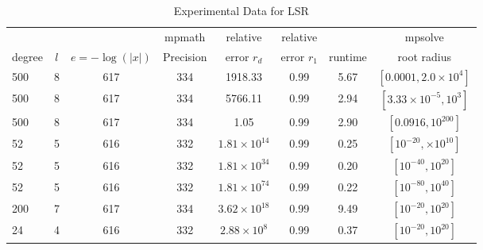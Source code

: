 \documentclass[sigconf]{acmart}
\begin{document}
\begin{table}[t]
\caption{Experimental Data for LSR} %
\label{tab:lsr}
\vskip 0.15in
\begin{center}
\begin{small}
\begin{sc}
\begin{tabular}{lccccccc}
\toprule
&  &  & mpmath & relative  & relative &  & mpsolve \\
degree  & $l$& $e=-\log(|x|)$& Precision &error $r_d$       & error $r_1$ &runtime& root radius\\
\midrule
 500 & 8 & 617 & 334 & 1918.33 & 0.99 & 5.67 & $[0.0001,2.0 \times 10^4]$ \\ %
 500 & 8 & 617 & 334 & 5766.11 & 0.99 & 2.94 & $[3.33 \times 10^{-5},10^{3}]$\\ %
 500 & 8 & 617 & 334 & 1.05 & 0.99 & 2.90 & $[0.0916,10^{200}]$\\ %
   52 & 5 & 616 & 332 & $1.81 \times 10^{14}$ & 0.99 & 0.25 & $[10^{-20},\times 10^{10}]$\\ %
   52 & 5 & 616 & 332 & $1.81 \times 10^{34}$ & 0.99 & 0.20 & $[10^{-40}, 10^{20}]$\\ %
   52 & 5 & 616 & 332 & $1.81 \times 10^{74}$ & 0.99 & 0.22 & $[10^{-80}, 10^{40}]$\\ %
 200 & 7 & 617 & 334 & $3.62 \times 10^{18}$ & 0.99 & 9.49 & $[10^{-20}, 10^{20}]$\\ %
   24 & 4 & 616 & 332 & $2.88 \times 10^{8}$ &  0.99 & 0.37 & $[10^{-20}, 10^{20}]$\\ %
\bottomrule
\end{tabular}
\end{sc}
\end{small}
\end{center}
\vskip -0.1in
\end{table}
\end{document}
